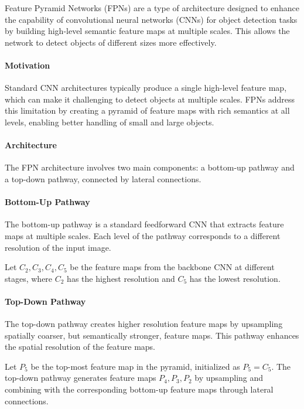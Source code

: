 \documentclass[12pt]{article}
\begin{document}
Feature Pyramid Networks (FPNs) are a type of architecture designed to enhance the capability of convolutional neural networks (CNNs) for object detection tasks by building high-level semantic feature maps at multiple scales. This allows the network to detect objects of different sizes more effectively.

\paragraph{Motivation}

Standard CNN architectures typically produce a single high-level feature map, which can make it challenging to detect objects at multiple scales. FPNs address this limitation by creating a pyramid of feature maps with rich semantics at all levels, enabling better handling of small and large objects.

\paragraph{Architecture}

The FPN architecture involves two main components: a bottom-up pathway and a top-down pathway, connected by lateral connections.

\paragraph{Bottom-Up Pathway}

The bottom-up pathway is a standard feedforward CNN that extracts feature maps at multiple scales. Each level of the pathway corresponds to a different resolution of the input image.

Let \( C_2, C_3, C_4, C_5 \) be the feature maps from the backbone CNN at different stages, where \( C_2 \) has the highest resolution and \( C_5 \) has the lowest resolution.

\paragraph{Top-Down Pathway}

The top-down pathway creates higher resolution feature maps by upsampling spatially coarser, but semantically stronger, feature maps. This pathway enhances the spatial resolution of the feature maps.

Let \( P_5 \) be the top-most feature map in the pyramid, initialized as \( P_5 = C_5 \). The top-down pathway generates feature maps \( P_4, P_3, P_2 \) by upsampling and combining with the corresponding bottom-up feature maps through lateral connections.
\end{document}
